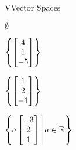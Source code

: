 \documentclass{article}[12pt]
\begin{document}
\begin{module}{V}{Vector Spaces}
\begin{readinessAssuranceTest}
    \begin{multicols}{2}
    \begin{readinessAssuranceTestChoices}
    \item \(\emptyset\)
    \item \(
            \left\{
            \begin{bmatrix}
              4 \\ 1 \\ -5
            \end{bmatrix}
            \right\}
          \)
    \item \(
            \left\{
            \begin{bmatrix}
              1 \\ 2 \\ -1
            \end{bmatrix}
            \right\}
          \)
    \item \(
            \left\{
            a
            \begin{bmatrix}
              -3 \\ 2 \\ 1
            \end{bmatrix}
            \,\middle|\,a\in\mathbb{R}\right\}
          \) %
    \end{readinessAssuranceTestChoices}
    \end{multicols}



  \end{readinessAssuranceTest}
\end{module}
\end{document}
